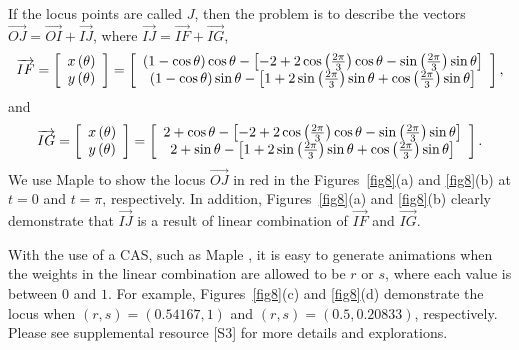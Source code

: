 \documentclass[12pt,a4paper]{article}%
\begin{document}
If the locus points are called $J$, then the problem is to describe the 
vectors $\overrightarrow{OJ}=\overrightarrow{OI}+\overrightarrow{IJ}$,
where $\overrightarrow{IJ}=\overrightarrow{IF}+\overrightarrow{IG}$,
\[
\overrightarrow{IF}=\left[
\begin{array}
[c]{c}%
x\left(  \theta\right) \\
y\left(  \theta\right)
\end{array}
\right]  =\left[
\begin{array}
[c]{c}%
\left(  1-\cos\theta\right)  \cos\theta-\left[  -2+2\cos\left(  \frac{2\pi}%
{3}\right)  \cos\theta-\sin\left(  \frac{2\pi}{3}\right)  \sin\theta\right] \\
\left(  1-\cos\theta\right)  \sin\theta-\left[  1+2\sin\left(  \frac{2\pi}%
{3}\right)  \sin\theta+\cos\left(  \frac{2\pi}{3}\right)  \sin\theta\right]
\end{array}
\right],
\]
and
\[
\overrightarrow{IG}=\left[
\begin{array}
[c]{c}%
x\left(  \theta\right) \\
y\left(  \theta\right)
\end{array}
\right]  =\left[
\begin{array}
[c]{c}%
2+\cos\theta-\left[  -2+2\cos\left(  \frac{2\pi}{3}\right)  \cos\theta
-\sin\left(  \frac{2\pi}{3}\right)  \sin\theta\right] \\
2+\sin\theta-\left[  1+2\sin\left(  \frac{2\pi}{3}\right)  \sin\theta
+\cos\left(  \frac{2\pi}{3}\right)  \sin\theta\right]
\end{array}
\right]  .
\]
We use Maple \cite{Maple} to show the locus $\overrightarrow{OJ}$ in red in
the Figures~\ref{fig8}(a) and \ref{fig8}(b) at $t=0$ and $t=\pi$, respectively.
In addition, Figures~\ref{fig8}(a) and \ref{fig8}(b) clearly demonstrate that
$\overrightarrow{IJ}$ is a result
of linear combination of $\overrightarrow{IF}$ and $\overrightarrow{IG}$.

With the use of a CAS, such as Maple \cite{Maple}, it is easy to generate
animations when the weights in the linear combination are allowed to be $r$ or $s$,
where each value is between $0$ and $1$.
For example, Figures~\ref{fig8}(c) and \ref{fig8}(d) demonstrate the locus when
$( r, s )  = ( 0.54167, 1 )$ and $( r, s )=( 0.5, 0.20833 )$, respectively.
Please see supplemental resource [S3] for more details and explorations.
\end{document}
